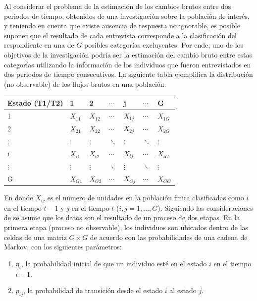 \documentclass[
  12pt,
  spanish,
]{book}
\providecommand{\tightlist}{%
  \setlength{\itemsep}{0pt}\setlength{\parskip}{0pt}}
\begin{document}
Al considerar el problema de la estimación de los cambios brutos entre dos periodos de tiempo, obtenidos de una investigación sobre la población de interés, y teniendo en cuenta que existe ausencia de respuesta no ignorable, es posible suponer que el resultado de cada entrevista corresponde a la clasificación del respondiente en una de \(G\) posibles categorías excluyentes. Por ende, uno de los objetivos de la investigación podría ser la estimación del cambio bruto entre estas categorías utilizando la información de los individuos que fueron entrevistados en dos periodos de tiempo consecutivos. La siguiente tabla ejemplifica la distribución (no observable) de los flujos brutos en una población.

\begin{longtable}[]{@{}lllllll@{}}
\toprule
Estado (T1/T2) & 1 & 2 & \(\cdots\) & j & \(\cdots\) & G \\
\midrule
\endhead
1 & \(X_{11}\) & \(X_{12}\) & \(\cdots\) & \(X_{1j}\) & \(\cdots\) & \(X_{1G}\) \\
2 & \(X_{21}\) & \(X_{22}\) & \(\cdots\) & \(X_{2j}\) & \(\cdots\) & \(X_{2G}\) \\
\(\vdots\) & \(\vdots\) & \(\vdots\) & \(\ddots\) & \(\vdots\) & \(\ddots\) & \(\vdots\) \\
i & \(X_{i1}\) & \(X_{i2}\) & \(\cdots\) & \(X_{ij}\) & \(\cdots\) & \(X_{iG}\) \\
\(\vdots\) & \(\vdots\) & \(\vdots\) & \(\ddots\) & \(\vdots\) & \(\ddots\) & \(\vdots\) \\
G & \(X_{G1}\) & \(X_{G2}\) & \(\cdots\) & \(X_{Gj}\) & \(\cdots\) & \(X_{GG}\) \\
\bottomrule
\end{longtable}

En donde \(X_{ij}\) es el número de unidades en la población finita clasificadas como \(i\) en el tiempo \(t-1\) y \(j\) en el tiempo \(t\) (\(i,j=1,\ldots, G\)). Siguiendo las consideraciones de \citet{Feinberg_Stasny_1983} se asume que los datos son el resultado de un proceso de dos etapas. En la primera etapa (proceso no observable), los individuos son ubicados dentro de las celdas de una matriz \(G\times G\) de acuerdo con las probabilidades de una cadena de Markov, con los siguientes parámetros:

\begin{enumerate}
\def\labelenumi{\arabic{enumi}.}
\tightlist
\item
  \(\eta_i\), la probabilidad inicial de que un individuo esté en el estado \(i\) en el tiempo \(t-1\).
\item
  \(p_{ij}\), la probabilidad de transición desde el estado \(i\) al estado \(j\).
\end{enumerate}
\end{document}
